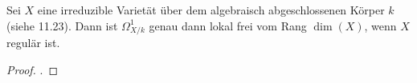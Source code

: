 \begin{thm}
\label{thm:13.10}
	Sei $X$ eine irreduzible Varietät über dem algebraisch abgeschlossenen Körper $k$ (siehe 11.23). Dann ist $\Omega_{X/k}^1$ genau dann lokal frei vom Rang $\dim(X)$, wenn $X$ regulär ist.
	\begin{proof}
		\cite[Theorem~II.8.15]{hartshorne1977algebraic}.
	\end{proof}
\end{thm}

